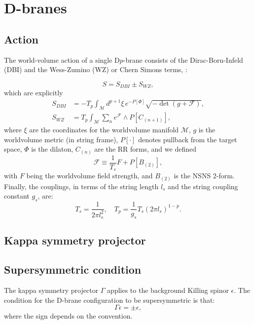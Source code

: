 \section{D-branes}

\subsection{Action}
The world-volume action of a single D$p$-brane consists of the Dirac-Born-Infeld (DBI) and the Wess-Zumino (WZ) or Chern Simons terms, \cite{Ammon:2015wua}:

\begin{equation}
 S = S_{DBI} \pm S_{WZ},
\end{equation}
which are explicitly
\begin{align}
 S_{DBI} & = 
 -T_p \int_\mathcal{M} d^{p+1}\xi \, e^{-P[\Phi] } \sqrt{-\det (g+\mathcal{F})},\\
 S_{WZ} & =
 T_p\int _\mathcal{M} \sum_n e^{\mathcal{F}}\wedge P[C_{(n+1)}],
\end{align}
where $\xi$ are the coordinates for the worldvolume manifold $\mathcal{M}$, $g$ is the worldvolume metric (in string frame), $P[\cdot]$ denotes pullback from the target space, $\Phi$ is the dilaton, $C_{(n)}$ are the RR forms, and we defined
\begin{equation}
 \mathcal{F} \equiv \frac{1}{T_s} F + P[B_{(2)}], 
\end{equation}
with $F$ being the worldvolume field strength, and $B_{(2)}$ is the NSNS 2-form. Finally, the couplings, in terms of the string length $l_s$ and the string coupling constant $g_s$, are:
\begin{equation}
 T_{s} = \dfrac{1}{2\pi l_s^2}, \quad T_p = \dfrac{1}{g_s} T_s (2\pi l_s)^{1-p}.
\end{equation}


\subsection{Kappa symmetry projector}



\subsection{Supersymmetric condition}
The kappa symmetry projector $\Gamma$ applies to the background Killing spinor $\epsilon$. The condition for the D-brane configuration to be supersymmetric is that:
\begin{equation}
 \Gamma \epsilon = \pm \epsilon,
\end{equation}
where the sign depends on the convention. 


